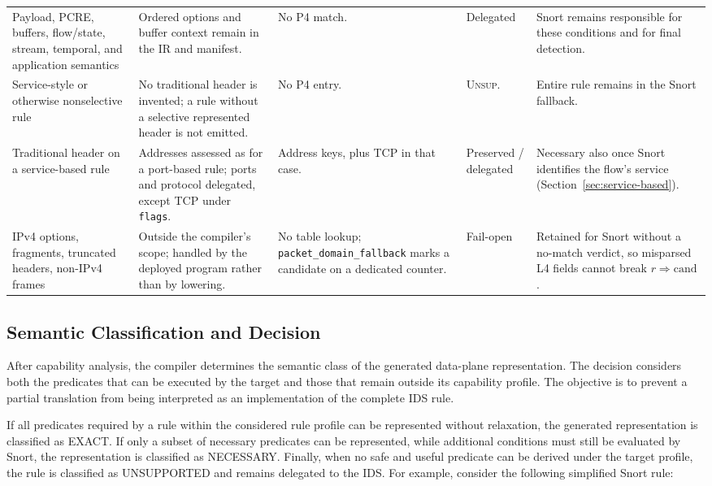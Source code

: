 \documentclass{article}
\begin{document}
\begin{landscape}
\begin{table}[p]
{\begin{tabular}{L{3.00cm}L{4.90cm}L{4.20cm}L{2.65cm}L{6.20cm}}
Payload, PCRE, buffers, flow/state, stream, temporal, and application semantics & Ordered options and buffer context remain in the IR and manifest. & No P4 match. & Delegated & Snort remains responsible for these conditions and for final detection. \\
Service-style or otherwise nonselective rule & No traditional header is invented; a rule without a selective represented header is not emitted. & No P4 entry. & \textsc{Unsup.} & Entire rule remains in the Snort fallback. \\
Traditional header on a service-based rule & Addresses assessed as for a port-based rule; ports and protocol delegated, except TCP under \texttt{flags}. & Address keys, plus TCP in that case. & Preserved / delegated & Necessary also once Snort identifies the flow's service (Section~\ref{sec:service-based}). \\
IPv4 options, fragments, truncated headers, non-IPv4 frames & Outside the compiler's scope; handled by the deployed program rather than by lowering. & No table lookup; \texttt{packet\_domain\_fallback} marks a candidate on a dedicated counter. & Fail-open & Retained for Snort without a no-match verdict, so misparsed L4 fields cannot break $r \Rightarrow \mathrm{cand}$. \\
\bottomrule
\end{tabular}
}
\end{table}
\end{landscape}
\subsection{Semantic Classification and Decision}
After capability analysis, the compiler determines the semantic class
of the generated data-plane representation. The decision considers both
the predicates that can be executed by the target and those that remain
outside its capability profile. The objective is to prevent a partial
translation from being interpreted as an implementation of the complete
IDS rule.

If all predicates required by a rule within the considered rule profile
can be represented without relaxation, the generated representation is
classified as EXACT. If only a subset of necessary predicates can be
represented, while additional conditions must still be evaluated by
Snort, the representation is classified as NECESSARY. Finally, when no
safe and useful predicate can be derived under the target profile, the
rule is classified as UNSUPPORTED and remains delegated to the IDS.
For example, consider the following simplified Snort rule:
\end{document}
